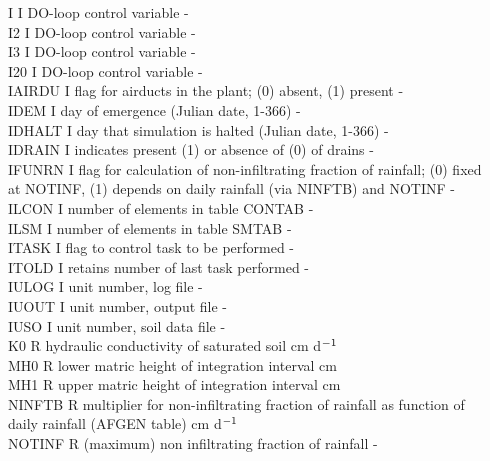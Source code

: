 \documentclass[11pt]{article}
\begin{document}
\begin{tabbing}
I\> \> I\> DO-loop control variable\> \> \> \> \> \> \> -\\
I2\> \> I\> DO-loop control variable\> \> \> \> \> \> \> - \\
I3\> \> I\> DO-loop control variable\> \> \> \> \> \> \> - \\
I20\> \> I\> DO-loop control variable\> \> \> \> \> \> \> - \\
IAIRDU\> \> I\> flag for airducts in the plant; (0) absent, (1) present\> \> \> \> \> \> \> -\\
IDEM\> \> I\> day of emergence (Julian date, 1-366)\> \> \> \> \> \> \> -\\
IDHALT\> \> I\> day that simulation is halted (Julian date, 1-366)\> \> \> \> \> \> \> -\\
IDRAIN\> \> I\> indicates present (1) or absence of (0) of drains\> \> \> \> \> \> \> -\\
IFUNRN\> \> I\> flag for calculation of non-infiltrating fraction of rainfall; (0) fixed\\
 \>\> \> at NOTINF, (1) depends on daily rainfall (via NINFTB) and NOTINF\> \> \> \> \> \> \> -\\
ILCON\> \> I\> number of elements in table CONTAB\> \> \> \> \> \> \> -\\
ILSM\> \> I\> number of elements in table SMTAB\> \> \> \> \> \> \> -\\
ITASK\> \> I\> flag to control task to be performed\> \> \> \> \> \> \> -\\
ITOLD\> \> I\> retains number of last task performed\> \> \> \> \> \> \> -\\
IULOG\> \> I\> unit number, log file\> \> \> \> \> \> \> -\\
IUOUT\> \> I\> unit number, output file\> \> \> \> \> \> \> -\\
IUSO\> \> I\> unit number, soil data file \> \> \> \> \> \> \> -\\
K0\> \> R\> hydraulic conductivity of saturated soil\> \> \> \> \> \> \> cm d$^{{\rm -1}}$\\
MH0\> \> R\> lower matric height of integration interval\> \> \> \> \> \> \> cm\\
MH1\> \> R\> upper matric height of integration interval\> \> \> \> \> \> \> cm\\
NINFTB\> \> R\> multiplier for non-infiltrating fraction of rainfall as function of\\
\>\> \> daily rainfall (AFGEN table)\> \> \> \> \> \> \> cm d$^{{\rm -1}}$\\
NOTINF\> \> R\> (maximum) non infiltrating fraction of rainfall\> \> \> \> \> \> \> -\\

\end{tabbing}
\end{document}
